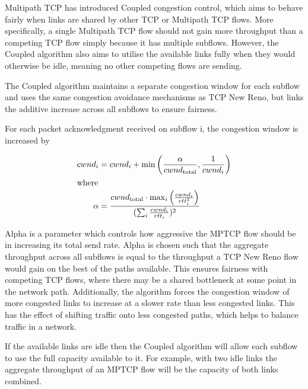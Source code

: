 Multipath TCP has introduced Coupled congestion control, which aims to behave 
fairly when links are shared by other TCP or Multipath TCP flows. More 
specifically, a single Multipath TCP flow should not gain more throughput than a 
competing TCP flow simply because it has multiple subflows. However, the Coupled 
algorithm also aims to utilise the available links fully when they would 
otherwise be idle, meaning no other competing flows are sending.

The Coupled algorithm maintains a separate congestion window for each subflow
and uses the same congestion avoidance mechanisms as TCP New Reno, but links the
additive increase across all subflows to ensure fairness.

For each packet acknowledgment received on subflow i, the congestion window is
increased by

\begin{align*}
  cwnd_i &= cwnd_i +
    \min\left(\frac{\alpha}{cwnd_\text{total}}, \frac{1}{cwnd_i}\right) \\
  \intertext{where}
  \alpha &=
    \frac{cwnd_\text{total} \cdot \max_i\left(\frac{cwnd_i}{rtt_i^2}\right)}
         {(\sum_i \frac{cwnd_i}{rtt_i})^2}
\end{align*}

Alpha is a parameter which controls how aggressive the MPTCP flow should be in
increasing its total send rate. Alpha is chosen such that the aggregate
throughput across all subflows is equal to the throughput a TCP New Reno flow
would gain on the best of the paths available. This ensures fairness with
competing TCP flows, where there may be a shared bottleneck at some point in the
network path. Additionally, the algorithm forces the congestion window of more
congested links to increase at a slower rate than less congested links. This has
the effect of shifting traffic  onto less congested paths, which helps to
balance traffic in a network.

If the available links are idle then the Coupled algorithm will allow each 
subflow to use the full capacity available to it. For example, with two idle 
links the aggregate throughput of an MPTCP flow will be the capacity of both 
links combined.


